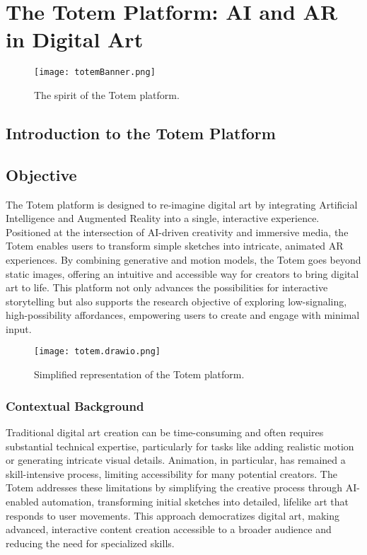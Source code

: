 \section{The Totem Platform: AI and AR in Digital Art}

\begin{figure}[h]
    \centering
    \texttt{[image: totemBanner.png]}
    \caption{The spirit of the Totem platform.}
    \vspace{0.1cm}
    \label{fig:spiritofTotem}
\end{figure}

\subsection{ Introduction to the Totem Platform}

\subsection{Objective}

The Totem platform is designed to re-imagine digital art by integrating Artificial Intelligence and Augmented Reality into a single, interactive experience.
Positioned at the intersection of AI-driven creativity and immersive media, the Totem enables users to transform simple sketches into intricate, animated AR experiences.
By combining generative and motion models, the Totem goes beyond static images, offering an intuitive and accessible way for creators to bring digital art to life.
This platform not only advances the possibilities for interactive storytelling but also supports the research objective of exploring low-signaling, high-possibility affordances, empowering users to create and engage with minimal input.

\begin{figure}[h]
    \centering
    \texttt{[image: totem.drawio.png]}
    \caption{Simplified representation of the Totem platform.}
    \vspace{0.1cm}
    \label{fig:totemImage}
\end{figure}

\subsubsection{Contextual Background}
Traditional digital art creation can be time-consuming and often requires substantial technical expertise, particularly for tasks like adding realistic motion or generating intricate visual details.
Animation, in particular, has remained a skill-intensive process, limiting accessibility for many potential creators.
The Totem addresses these limitations by simplifying the creative process through AI-enabled automation, transforming initial sketches into detailed, lifelike art that responds to user movements.
This approach democratizes digital art, making advanced, interactive content creation accessible to a broader audience and reducing the need for specialized skills.

